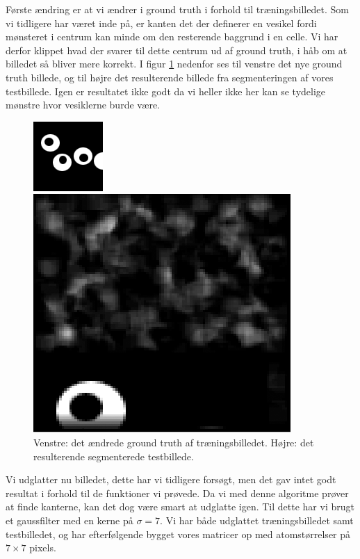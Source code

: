 Første ændring er at vi ændrer i ground truth i forhold til træningsbilledet. Som vi tidligere har været inde på, er kanten det der definerer en vesikel fordi mønsteret i centrum kan minde om den resterende baggrund i en celle. Vi har derfor klippet hvad der svarer til dette centrum ud af ground truth, i håb om at billedet så bliver mere korrekt. I figur \ref{fig:postmethod_sld_gt4} nedenfor ses til venstre det nye ground truth billede, og til højre det resulterende billede fra segmenteringen af vores testbillede. Igen er resultatet ikke godt da vi heller ikke her kan se tydelige mønstre hvor vesiklerne burde være.

\begin{figure}[H]
	\begin{minipage}[b]{0.5\linewidth}
		\centering
		\includegraphics[scale=3]{files/postmethod/img/imGT3.png}
	\end{minipage}
	\hspace{0.8cm}
	\begin{minipage}[b]{0.5\linewidth}
		\centering
		\includegraphics[scale=0.42]{files/postmethod/img/sld_res3.png}
	\end{minipage}
	\caption{Venstre: det ændrede ground truth af træningsbilledet. Højre: det resulterende segmenterede testbillede.\label{fig:postmethod_sld_gt4}}
\end{figure}

Vi udglatter nu billedet, dette har vi tidligere forsøgt, men det gav intet godt resultat i forhold til de funktioner vi prøvede. %
Da vi med denne algoritme prøver at finde kanterne, kan det dog være smart at udglatte igen. Til dette har vi brugt et gaussfilter med en kerne på $\sigma=7$. %
Vi har både udglattet træningsbilledet samt testbilledet, og har efterfølgende bygget vores matricer op med atomstørrelser på $7\times7$ pixels.

